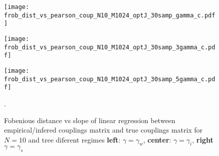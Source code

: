 \documentclass[reprint,amsmath,amssymb,superscriptaddress,showpacs,pre]{revtex4-1}
\begin{document}
\begin{figure*}[!htb]
	\begin{minipage}[b]{0.325\textwidth}
		\begin{center}
			\texttt{[image: frob\_dist\_vs\_pearson\_coup\_N10\_M1024\_optJ\_30samp\_gamma\_c.pdf]}
		\end{center}
	\end{minipage}
	\begin{minipage}[b]{0.325\textwidth}
		\begin{center}
			\texttt{[image: frob\_dist\_vs\_pearson\_coup\_N10\_M1024\_optJ\_30samp\_3gamma\_c.pdf]}
		\end{center}
	\end{minipage}
	\begin{minipage}[b]{0.325\textwidth}
		\begin{center}
			\texttt{[image: frob\_dist\_vs\_pearson\_coup\_N10\_M1024\_optJ\_30samp\_5gamma\_c.pdf]}
		\end{center}
	\end{minipage}
	
	\vspace{-1mm}
	\caption{{ Fobenious distance vs slope of linear regression between empirical/infered couplings matrix and true couplings matrix   for $N=10$ and tree diferent regimes \textbf{left}: $\gamma=\gamma_w$, \textbf{center}: $\gamma=\gamma_i$, \textbf{right} $\gamma=\gamma_s$  }} .
	\label{results_corr_map_J_10_n10}
\end{figure*}
\end{document}
